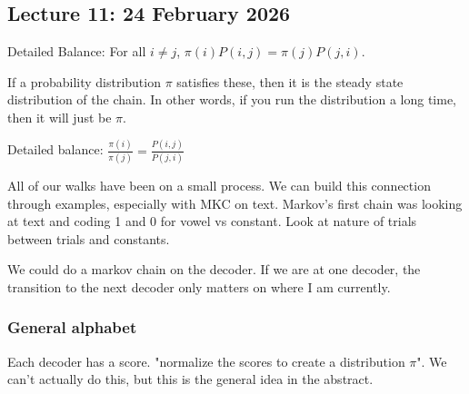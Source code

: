 \documentclass{report}
\begin{document}
\chapter{}
\section{Lecture 11: 24 February 2026} 

Detailed Balance: For all $ i \neq j $, $ \pi(i)P(i,j) = \pi(j) P(j,i) $. 

\noindent
If a probability distribution $ \pi $ satisfies these, then it is the steady state distribution of the chain. In other words, if you run the distribution a long time, then it will just be $ \pi $. 

\noindent
Detailed balance: $ \frac{\pi(i)}{\pi(j)} = \frac{P(i,j)}{P(j,i)} $ 

All of our walks have been on a small process. We can build this connection through examples, especially with MKC on text. Markov's first chain was looking at text and coding 1 and 0 for vowel vs constant. Look at nature of trials between trials and constants. 

\vspace{5mm}

We could do a markov chain on the decoder. If we are at one decoder, the transition to the next decoder only matters on where I am currently. 

\subsection{General alphabet}
Each decoder has a score. "normalize the scores to create a distribution $ \pi $". We can't actually do this, but this is the general idea in the abstract. 
\end{document}
